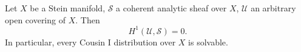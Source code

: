 Let $X$ be a Stein manifold, $\mathcal{S}$ a coherent analytic sheaf over $X$, $\mathcal{U}$ an arbitrary open covering of $X$. Then
$$H^1(\mathcal{U}, \mathcal{S}) = 0.$$
In particular, every Cousin I distribution over $X$ is solvable.
